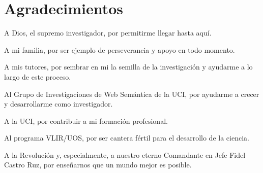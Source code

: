 \chapter*{\large Agradecimientos}



A Dios, el supremo investigador, por permitirme llegar hasta aquí.

A mi familia, por ser ejemplo de perseverancia y apoyo en todo momento.

A mis tutores, por sembrar en mi la semilla de la investigación y ayudarme a lo largo de este proceso.

Al Grupo de Investigaciones de Web Semántica de la UCI, por ayudarme a crecer y desarrollarme como investigador.

A la UCI, por contribuir a mi formación profesional.

Al programa VLIR/UOS, por ser cantera fértil para el desarrollo de la ciencia.

A la Revolución y, especialmente, a nuestro eterno Comandante en Jefe Fidel Castro Ruz, por enseñarnos que un mundo mejor es posible.

\begin{center}
	\bf{\autorUNO}
\end{center}
